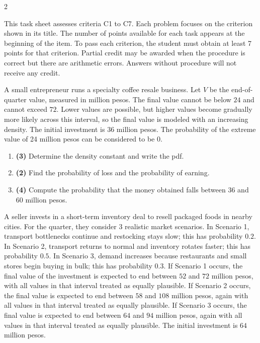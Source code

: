 	\begin{multicols}{2}
		
		\vspace{-0.3cm}
		This task sheet assesses criteria C1 to C7. Each problem focuses on the criterion shown in its title. The number of points available for each task appears at the beginning of the item. To pass each criterion, the student must obtain at least 7 points for that criterion. Partial credit may be awarded when the procedure is correct but there are arithmetic errors. Answers without procedure will not receive any credit.
		
		\vspace{0.25cm}
		\vspace{-0.3cm}
		A small entrepreneur runs a specialty coffee resale business. Let $V$ be the end-of-quarter value, measured in million pesos. The final value cannot be below $24$ and cannot exceed $72$. Lower values are possible, but higher values become gradually more likely across this interval, so the final value is modeled with an increasing density. The initial investment is $36$ million pesos. The probability of the extreme value of 24 million pesos can be considered to be 0.
		
		
		\begin{enumerate}[label=\textbf{\alph*)}]
			\item \textbf{(3)} Determine the density constant and write the pdf.
			\item \textbf{(2)} Find the probability of loss and the probability of earning.
			\item \textbf{(4)} Compute the probability that the money obtained falls between \(36\) and \(60\) million pesos.
		\end{enumerate}
		
		\vspace{0.25cm}
		\vspace{-0.3cm}
		A seller invests in a short-term inventory deal to resell packaged foods in nearby cities. For the quarter, they consider 3 realistic market scenarios. In Scenario 1, transport bottlenecks continue and restocking stays slow; this has probability $0.2$. In Scenario 2, transport returns to normal and inventory rotates faster; this has probability $0.5$. In Scenario 3, demand increases because restaurants and small stores begin buying in bulk; this has probability $0.3$. If Scenario 1 occurs, the final value of the investment is expected to end between $52$ and $72$ million pesos, with all values in that interval treated as equally plausible. If Scenario 2 occurs, the final value is expected to end between $58$ and $108$ million pesos, again with all values in that interval treated as equally plausible. If Scenario 3 occurs, the final value is expected to end between $64$ and $94$ million pesos, again with all values in that interval treated as equally plausible. The initial investment is $64$ million pesos.
		

\end{multicols}
